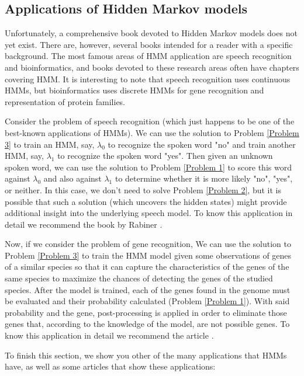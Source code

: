 \documentclass[12pt]{article}
\numberwithin{equation}{section}
\begin{document}
\subsection{Applications of Hidden Markov models}

Unfortunately, a comprehensive book devoted to Hidden Markov models does not yet exist. There are, however, several books intended for a reader with a specific background. The most famous areas of HMM application are speech recognition and bioinformatics, and books devoted to these research areas often have chapters covering HMM. It is interesting to note that speech recognition uses continuous HMMs, but bioinformatics uses discrete HMMs for gene recognition and representation of protein families.

Consider the problem of speech recognition (which just happens to be one of the best-known applications of HMMs). We can use the solution to Problem \ref{Problem 3} to train an HMM, say, $\lambda_{0}$ to recognize the spoken word "no" and train another HMM, say, $\lambda_{1}$ to recognize the spoken word "yes". Then given an unknown spoken word, we can use the solution to Problem \ref{Problem 1} to score this word against $\lambda_{0}$ and also against $\lambda_{1}$ to determine whether it is more likely "no", "yes", or neither. In this case, we don't need to solve Problem \ref{Problem 2}, but it is possible that such a solution (which uncovers the hidden states) might provide additional insight into the underlying speech model. To know this application in detail we recommend the book by Rabiner \cite{rabiner1989tutorial}.

Now, if we consider the problem of gene recognition, We can use the solution to Problem \ref{Problem 3} to train the HMM model given some observations of genes of a similar species so that it can capture the characteristics of the genes of the same species to maximize the chances of detecting the genes of the studied species. After the model is trained, each of the genes found in the genome must be evaluated and their probability calculated (Problem \ref{Problem 1}). With said probability and the gene, post-processing is applied in order to eliminate those genes that, according to the knowledge of the model, are not possible genes. To know this application in detail we recommend the article \cite{stanke2003gene}.

To finish this section, we show you other of the many applications that HMMs have, as well as some articles that show these applications:
\end{document}
